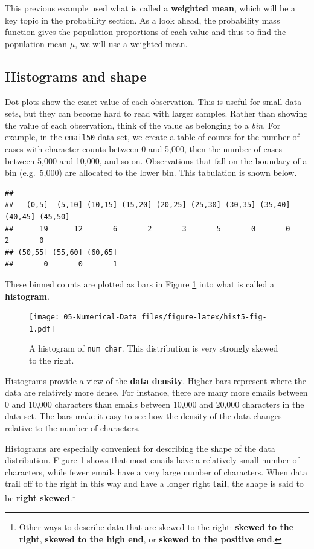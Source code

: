 \documentclass[
]{book}
\begin{document}
This previous example used what is called a \textbf{weighted mean}, which will be a key topic in the probability section. As a look ahead, the probability mass function gives the population proportions of each value and thus to find the population mean \(\mu\), we will use a weighted mean.

\hypertarget{histograms-and-shape}{%
\subsection{Histograms and shape}\label{histograms-and-shape}}

Dot plots show the exact value of each observation. This is useful for small data sets, but they can become hard to read with larger samples. Rather than showing the value of each observation, think of the value as belonging to a \emph{bin}. For example, in the \texttt{email50} data set, we create a table of counts for the number of cases with character counts between 0 and 5,000, then the number of cases between 5,000 and 10,000, and so on. Observations that fall on the boundary of a bin (e.g.~5,000) are allocated to the lower bin. This tabulation is shown below.

\begin{verbatim}
## 
##   (0,5]  (5,10] (10,15] (15,20] (20,25] (25,30] (30,35] (35,40] (40,45] (45,50] 
##      19      12       6       2       3       5       0       0       2       0 
## (50,55] (55,60] (60,65] 
##       0       0       1
\end{verbatim}

These binned counts are plotted as bars in Figure \ref{fig:hist5-fig} into what is called a \textbf{histogram}.

\begin{figure}
\centering
\texttt{[image: 05-Numerical-Data\_files/figure-latex/hist5-fig-1.pdf]}
\caption{\label{fig:hist5-fig}A histogram of \texttt{num\_char}. This distribution is very strongly skewed to the right.}
\end{figure}

Histograms provide a view of the \textbf{data density}. Higher bars represent where the data are relatively more dense. For instance, there are many more emails between 0 and 10,000 characters than emails between 10,000 and 20,000 characters in the data set. The bars make it easy to see how the density of the data changes relative to the number of characters.

Histograms are especially convenient for describing the shape of the data distribution. Figure \ref{fig:hist5-fig} shows that most emails have a relatively small number of characters, while fewer emails have a very large number of characters. When data trail off to the right in this way and have a longer right \textbf{tail}, the shape is said to be \textbf{right skewed}.\footnote{Other ways to describe data that are skewed to the right: \textbf{skewed to the right}, \textbf{skewed to the high end}, or \textbf{skewed to the positive end}.}
\end{document}
